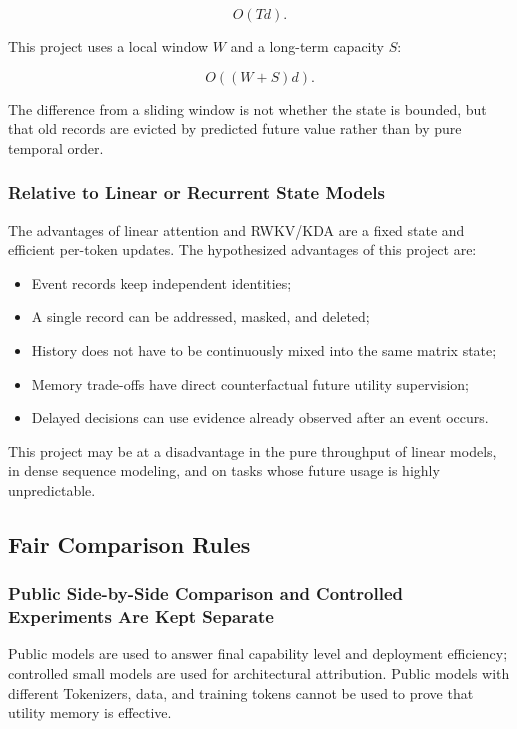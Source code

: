 \[
O(Td).
\]

This project uses a local window $W$ and a long-term capacity $S$:

\[
O((W+S)d).
\]

The difference from a sliding window is not whether the state is bounded, but that old records are evicted by predicted future value rather than by pure temporal order.

\subsubsection{Relative to Linear or Recurrent State Models}

The advantages of linear attention and RWKV/KDA are a fixed state and efficient per-token updates. The hypothesized advantages of this project are:

\begin{itemize}
  \item Event records keep independent identities;
  \item A single record can be addressed, masked, and deleted;
  \item History does not have to be continuously mixed into the same matrix state;
  \item Memory trade-offs have direct counterfactual future utility supervision;
  \item Delayed decisions can use evidence already observed after an event occurs.
\end{itemize}

This project may be at a disadvantage in the pure throughput of linear models, in dense sequence modeling, and on tasks whose future usage is highly unpredictable.

\subsection{Fair Comparison Rules}

\subsubsection{Public Side-by-Side Comparison and Controlled Experiments Are Kept Separate}

Public models are used to answer final capability level and deployment efficiency; controlled small models are used for architectural attribution. Public models with different Tokenizers, data, and training tokens cannot be used to prove that utility memory is effective.


